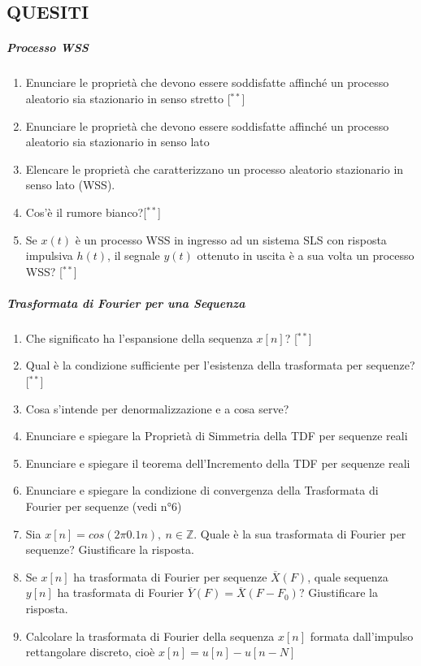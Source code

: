 \documentclass[
]{article}
\author{}
\date{}
\providecommand{\tightlist}{%
  \setlength{\itemsep}{0pt}\setlength{\parskip}{0pt}}
\begin{document}
\subsection{QUESITI}\label{quesiti}

\subparagraph{Processo WSS}\label{processo-wss}

\begin{enumerate}
\def\labelenumi{\arabic{enumi}.}
\tightlist
\item
  Enunciare le proprietà che devono essere soddisfatte affinché un
  processo aleatorio sia stazionario in senso stretto {[}\(^{**}\){]}
\item
  Enunciare le proprietà che devono essere soddisfatte affinché un
  processo aleatorio sia stazionario in senso lato
\item
  Elencare le proprietà che caratterizzano un processo aleatorio
  stazionario in senso lato (WSS).
\item
  Cos'è il rumore bianco?{[}\(^{**}\){]}
\item
  Se \(x(t)\) è un processo WSS in ingresso ad un sistema SLS con
  risposta impulsiva \(h(t)\), il segnale \(y(t)\) ottenuto in uscita è
  a sua volta un processo WSS? {[}\(^{**}\){]}
\end{enumerate}

\subparagraph{Trasformata di Fourier per una
Sequenza}\label{trasformata-di-fourier-per-una-sequenza}

\begin{enumerate}
\def\labelenumi{\arabic{enumi}.}
\setcounter{enumi}{5}
\tightlist
\item
  Che significato ha l'espansione della sequenza \(x[n]\)?
  {[}\(^{**}\){]}
\item
  Qual è la condizione sufficiente per l'esistenza della trasformata per
  sequenze? {[}\(^{**}\){]}
\item
  Cosa s'intende per denormalizzazione e a cosa serve?
\item
  Enunciare e spiegare la Proprietà di Simmetria della TDF per sequenze
  reali
\item
  Enunciare e spiegare il teorema dell'Incremento della TDF per sequenze
  reali
\item
  Enunciare e spiegare la condizione di convergenza della Trasformata di
  Fourier per sequenze (vedi n°6)
\item
  Sia \(x[n] = cos(2\pi 0.1 n), \ n \in \mathbb{Z}\). Quale è la sua
  trasformata di Fourier per sequenze? Giustificare la risposta.
\item
  Se \(x[n]\) ha trasformata di Fourier per sequenze
  \(\overline{X}(F)\), quale sequenza \(y[n]\) ha trasformata di Fourier
  \(\overline{Y}(F) = \overline{X}(F - F_0)\)? Giustificare la risposta.
\item
  Calcolare la trasformata di Fourier della sequenza \(x[n]\) formata
  dall'impulso rettangolare discreto, cioè \(x[n]= u[n]-u[n-N]\)
\end{enumerate}
\end{document}
